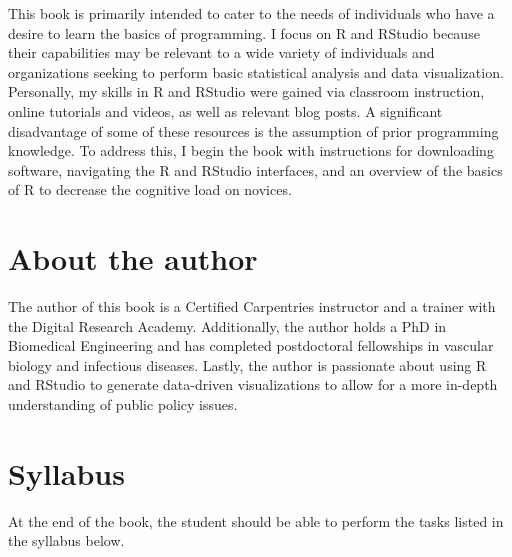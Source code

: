 \documentclass[
  letterpaper,
  DIV=11,
  numbers=noendperiod]{scrreprt}
\begin{document}

This book is primarily intended to cater to the needs of individuals who
have a desire to learn the basics of programming. I focus on R and
RStudio because their capabilities may be relevant to a wide variety of
individuals and organizations seeking to perform basic statistical
analysis and data visualization. Personally, my skills in R and RStudio
were gained via classroom instruction, online tutorials and videos, as
well as relevant blog posts. A significant disadvantage of some of these
resources is the assumption of prior programming knowledge. To address
this, I begin the book with instructions for downloading software,
navigating the R and RStudio interfaces, and an overview of the basics
of R to decrease the cognitive load on novices.

\section*{About the author}\label{about-the-author}


The author of this book is a Certified Carpentries instructor and a
trainer with the Digital Research Academy. Additionally, the author
holds a PhD in Biomedical Engineering and has completed postdoctoral
fellowships in vascular biology and infectious diseases. Lastly, the
author is passionate about using R and RStudio to generate data-driven
visualizations to allow for a more in-depth understanding of public
policy issues.

\section*{Syllabus}\label{syllabus}


At the end of the book, the student should be able to perform the tasks
listed in the syllabus below.
\end{document}
